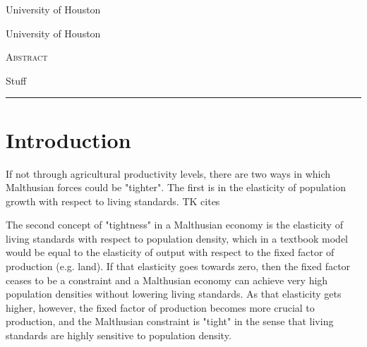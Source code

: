 \documentclass[10pt]{article}
\begin{document}
\begin{titlepage}
\vspace{2in} \noindent {\large \today}

\vspace{.5in} 

\vspace{.25in} 

\vspace{.05in} \noindent University of Houston

\vspace{.25in} 

\vspace{.05in} \noindent University of Houston

\vfill \noindent \textsc{Abstract} \hrulefill

\vspace{.05in} \noindent Stuff

\vspace{.1in} \hrule

\vspace{.5in} 

\vspace{.1in} 

\vspace{.1in} 
\end{titlepage}

\pagebreak 

\section{Introduction}
\onehalfspacing

If not through agricultural productivity levels, there are two ways in which Malthusian forces could be "tighter". The first is in the elasticity of population growth with respect to living standards. TK cites

The second concept of "tightness" in a Malthusian economy is the elasticity of living standards with respect to population density, which in a textbook model would be equal to the elasticity of output with respect to the fixed factor of production (e.g. land). If that elasticity goes towards zero, then the fixed factor ceases to be a constraint and a Malthusian economy can achieve very high population densities without lowering living standards. As that elasticity gets higher, however, the fixed factor of production becomes more crucial to production, and the Malthusian constraint is "tight" in the sense that living standards are highly sensitive to population density. 
\end{document}
